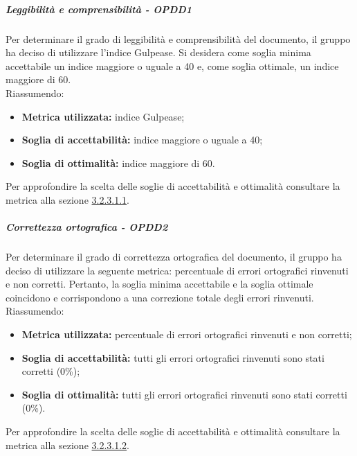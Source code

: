 \documentclass[PianoDiQualifica.tex]{subfiles}
\begin{document}
				\subparagraph{Leggibilità e comprensibilità - OPDD1}
				Per determinare il grado di leggibilità e comprensibilità del documento, il gruppo ha deciso di utilizzare l'indice Gulpease. Si desidera come soglia minima accettabile un indice
				maggiore o uguale a 40 e, come soglia ottimale, un indice maggiore di 60. \\
				Riassumendo:
				\begin{itemize}
				\item \textbf{Metrica utilizzata:} indice Gulpease;
				\item \textbf{Soglia di accettabilità:} indice maggiore o uguale a 40;
				\item \textbf{Soglia di ottimalità:} indice maggiore di 60.
				\end{itemize}
				Per approfondire la scelta delle soglie di accettabilità e ottimalità consultare la metrica alla sezione \hyperlink{leggi_m}{3.2.3.1.1}.

				\subparagraph{Correttezza ortografica - OPDD2}
				Per determinare il grado di correttezza ortografica del documento, il gruppo ha deciso di utilizzare la seguente metrica: percentuale di errori ortografici rinvenuti e non corretti.
				Pertanto, la soglia minima accettabile e la soglia ottimale coincidono e corrispondono a una correzione totale degli errori rinvenuti. \\
				Riassumendo:
				\begin{itemize}
				\item \textbf{Metrica utilizzata:} percentuale di errori ortografici rinvenuti e non corretti;
				\item \textbf{Soglia di accettabilità:} tutti gli errori ortografici rinvenuti sono stati corretti (0\%);
				\item \textbf{Soglia di ottimalità:} tutti gli errori ortografici rinvenuti sono stati corretti (0\%).
				\end{itemize}
				Per approfondire la scelta delle soglie di accettabilità e ottimalità consultare la metrica alla sezione \hyperlink{err_ortografici}{3.2.3.1.2}.
\end{document}
